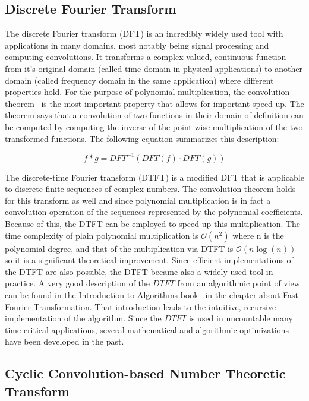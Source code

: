 \subsection{Discrete Fourier Transform}

The discrete Fourier transform (DFT) is an incredibly widely used tool with applications in many domains, most notably being signal processing and computing convolutions. It transforms a complex-valued, continuous function from it's original domain (called time domain in physical applications) to another domain (called frequency domain in the same application) where different properties hold. For the purpose of polynomial multiplication, the convolution theorem~\parencite{enwiki:1171895737} is the most important property that allows for important speed up. The theorem says that a convolution of two functions in their domain of definition can be computed by computing the inverse of the point-wise multiplication of the two transformed functions. The following equation summarizes this description:

\begin{equation*}
    f * g = DFT^{-1}(DFT(f) \cdot DFT(g))
\end{equation*}

The discrete-time Fourier transform (DTFT) is a modified DFT that is applicable to discrete finite sequences of complex numbers. The convolution theorem holds for this transform as well and since polynomial multiplication is in fact a convolution operation of the sequences represented by the polynomial coefficients. Because of this, the DTFT can be employed to speed up this multiplication. The time complexity of plain polynomial multiplication is $\mathcal{O}(n^2)$ where n is the polynomial degree, and that of the multiplication via DTFT is $\mathcal{O}(n \log(n))$ so it is a significant theoretical improvement. Since efficient implementations of the DTFT are also possible, the DTFT became also a widely used tool in practice. A very good description of the $DTFT$ from an algorithmic point of view can be found in the Introduction to Algorithms book~\parencite{10.5555/1614191} in the chapter about Fast Fourier Transformation. That introduction leads to the intuitive, recursive implementation of the algorithm. Since the $DTFT$ is used in uncountable many time-critical applications, several mathematical and algorithmic optimizations have been developed in the past.

\subsection{Cyclic Convolution-based Number Theoretic Transform}

